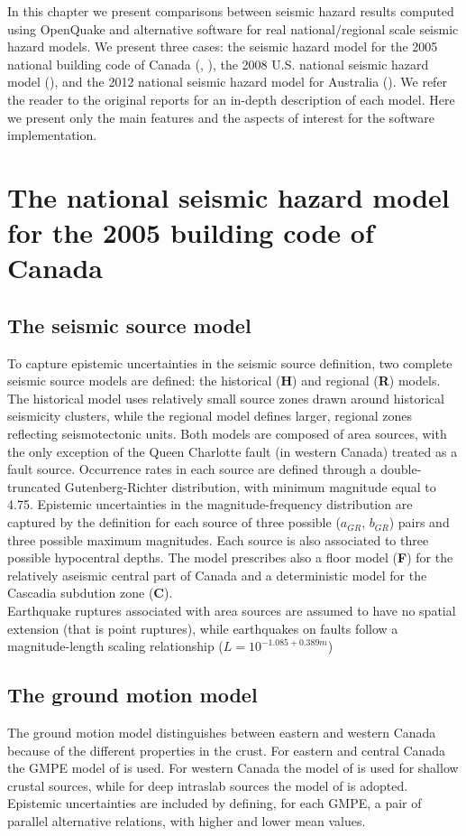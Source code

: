In this chapter we present comparisons between seismic hazard results computed using OpenQuake and alternative software for real national/regional scale seismic hazard models. We present three cases: the seismic hazard model for the 2005 national building code of Canada (\cite{adams2003}, \cite{halchuk2008}), the 2008 U.S. national seismic hazard model (\cite{petersen2008}), and the 2012 national seismic hazard model for Australia (\cite{burbidge2012}). We refer the reader to the original reports for an in-depth description of each model. Here we present only the main features and the aspects of interest for the software implementation.


\section{The national seismic hazard model for the 2005 building code of Canada}

\subsection{The seismic source model}
To capture epistemic uncertainties in the seismic source definition, two complete seismic source models are defined: the historical (\textbf{H}) and regional (\textbf{R}) models. The historical model uses relatively small source zones drawn around historical seismicity clusters, while the regional model defines larger, regional zones reflecting seismotectonic units. Both models are composed of area sources, with the only exception of the Queen Charlotte fault (in western Canada) treated as a fault source. Occurrence rates in each source are defined through a double-truncated Gutenberg-Richter distribution, with minimum magnitude equal to 4.75.
Epistemic uncertainties in the magnitude-frequency distribution are captured by the definition for each source of three possible ($a_{GR}$, $b_{GR}$) pairs and three possible maximum magnitudes. Each source is also associated to three possible hypocentral depths. The model prescribes also a floor model (\textbf{F}) for the relatively aseismic central part of Canada and a deterministic model for the Cascadia subdution zone (\textbf{C}).\\
Earthquake ruptures associated with area sources are assumed to have no spatial extension (that is point ruptures), while earthquakes on faults follow a magnitude-length scaling relationship ($L=10^{-1.085 + 0.389 m}$)

\subsection{The ground motion model}
The ground motion model distinguishes between eastern and western Canada because of the different properties in the crust. For eastern and central Canada the GMPE model of \cite{ab1995} is used. For western Canada the model of \cite{bjf1993} is used for shallow crustal sources, while for deep intraslab sources the model of \cite{y1997} is adopted. Epistemic uncertainties are included by defining, for each GMPE, a pair of parallel alternative relations, with higher and lower mean values.


